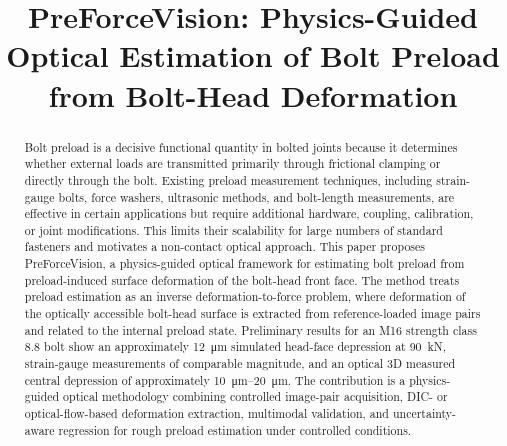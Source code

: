 \documentclass[colorlinks,upint,subscriptcorrection,varvw,hyphenate]{asmeconf}
\begin{document}

\title{PreForceVision: Physics-Guided Optical Estimation of Bolt Preload from Bolt-Head Deformation}



\maketitle


\begin{abstract} Bolt preload is a decisive functional quantity in bolted joints because it determines whether external loads are transmitted primarily through frictional clamping or directly through the bolt. Existing preload measurement techniques, including strain-gauge bolts, force washers, ultrasonic methods, and bolt-length measurements, are effective in certain applications but require additional hardware, coupling, calibration, or joint modifications. This limits their scalability for large numbers of standard fasteners and motivates a non-contact optical approach. This paper proposes PreForceVision, a physics-guided optical framework for estimating bolt preload from preload-induced surface deformation of the bolt-head front face. The method treats preload estimation as an inverse deformation-to-force problem, where deformation of the optically accessible bolt-head surface is extracted from reference-loaded image pairs and related to the internal preload state. Preliminary results for an M16 strength class 8.8 bolt show an approximately \SI{12}{\micro\meter} simulated head-face depression at \SI{90}{\kilo\newton}, strain-gauge measurements of comparable magnitude, and an optical 3D measured central depression of approximately \SIrange{10}{20}{\micro\meter}. The contribution is a physics-guided optical methodology combining controlled image-pair acquisition, DIC- or optical-flow-based deformation extraction, multimodal validation, and uncertainty-aware regression for rough preload estimation under controlled conditions.
\end{abstract}
\end{document}
